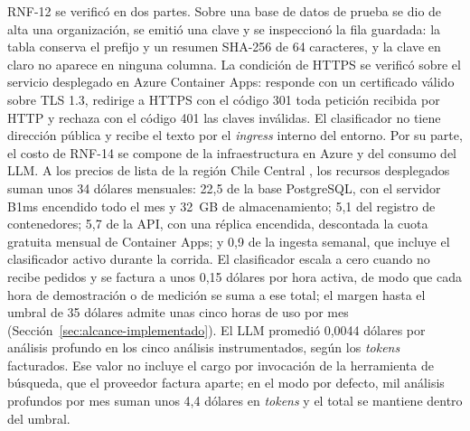 RNF-12 se verificó en dos partes. Sobre una base de datos de prueba se dio de alta una organización, se emitió una clave y se inspeccionó la fila guardada: la tabla conserva el prefijo y un resumen SHA-256 de 64 caracteres, y la clave en claro no aparece en ninguna columna. La condición de HTTPS se verificó sobre el servicio desplegado en Azure Container Apps: responde con un certificado válido sobre TLS 1.3, redirige a HTTPS con el código 301 toda petición recibida por HTTP y rechaza con el código 401 las claves inválidas. El clasificador no tiene dirección pública y recibe el texto por el \textit{ingress} interno del entorno. Por su parte, el costo de RNF-14 se compone de la infraestructura en Azure y del consumo del LLM. A los precios de lista de la región Chile Central \parencite{MicrosoftAzure2026, MicrosoftAzureContainerApps2026, MicrosoftAzureRegistro2026}, los recursos desplegados suman unos 34 dólares mensuales: 22,5 de la base PostgreSQL, con el servidor B1ms encendido todo el mes y 32~GB de almacenamiento; 5,1 del registro de contenedores; 5,7 de la API, con una réplica encendida, descontada la cuota gratuita mensual de Container Apps; y 0,9 de la ingesta semanal, que incluye el clasificador activo durante la corrida. El clasificador escala a cero cuando no recibe pedidos y se factura a unos 0,15 dólares por hora activa, de modo que cada hora de demostración o de medición se suma a ese total; el margen hasta el umbral de 35 dólares admite unas cinco horas de uso por mes (Sección~\ref{sec:alcance-implementado}). El LLM promedió 0,0044 dólares por análisis profundo en los cinco análisis instrumentados, según los \textit{tokens} facturados. Ese valor no incluye el cargo por invocación de la herramienta de búsqueda, que el proveedor factura aparte; en el modo por defecto, mil análisis profundos por mes suman unos 4,4 dólares en \textit{tokens} y el total se mantiene dentro del umbral.

